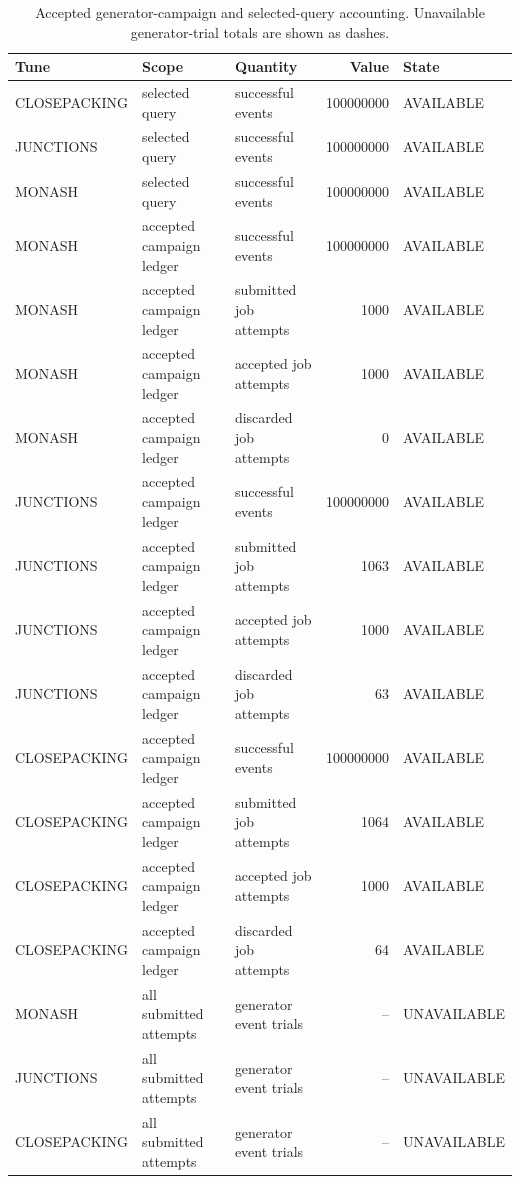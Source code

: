 \begin{table}[tbp]
\centering
\small
\caption{Accepted generator-campaign and selected-query accounting. Unavailable generator-trial totals are shown as dashes.}
\label{tab:campaign-accounting}
\begin{tabular}{@{}lllrl@{}}
\toprule
Tune & Scope & Quantity & Value & State \\
\midrule
CLOSEPACKING & selected query & successful events & \num{100000000} & AVAILABLE \\
JUNCTIONS & selected query & successful events & \num{100000000} & AVAILABLE \\
MONASH & selected query & successful events & \num{100000000} & AVAILABLE \\
MONASH & accepted campaign ledger & successful events & \num{100000000} & AVAILABLE \\
MONASH & accepted campaign ledger & submitted job attempts & \num{1000} & AVAILABLE \\
MONASH & accepted campaign ledger & accepted job attempts & \num{1000} & AVAILABLE \\
MONASH & accepted campaign ledger & discarded job attempts & \num{0} & AVAILABLE \\
JUNCTIONS & accepted campaign ledger & successful events & \num{100000000} & AVAILABLE \\
JUNCTIONS & accepted campaign ledger & submitted job attempts & \num{1063} & AVAILABLE \\
JUNCTIONS & accepted campaign ledger & accepted job attempts & \num{1000} & AVAILABLE \\
JUNCTIONS & accepted campaign ledger & discarded job attempts & \num{63} & AVAILABLE \\
CLOSEPACKING & accepted campaign ledger & successful events & \num{100000000} & AVAILABLE \\
CLOSEPACKING & accepted campaign ledger & submitted job attempts & \num{1064} & AVAILABLE \\
CLOSEPACKING & accepted campaign ledger & accepted job attempts & \num{1000} & AVAILABLE \\
CLOSEPACKING & accepted campaign ledger & discarded job attempts & \num{64} & AVAILABLE \\
MONASH & all submitted attempts & generator event trials & -- & UNAVAILABLE \\
JUNCTIONS & all submitted attempts & generator event trials & -- & UNAVAILABLE \\
CLOSEPACKING & all submitted attempts & generator event trials & -- & UNAVAILABLE \\
\bottomrule
\end{tabular}
\end{table}
